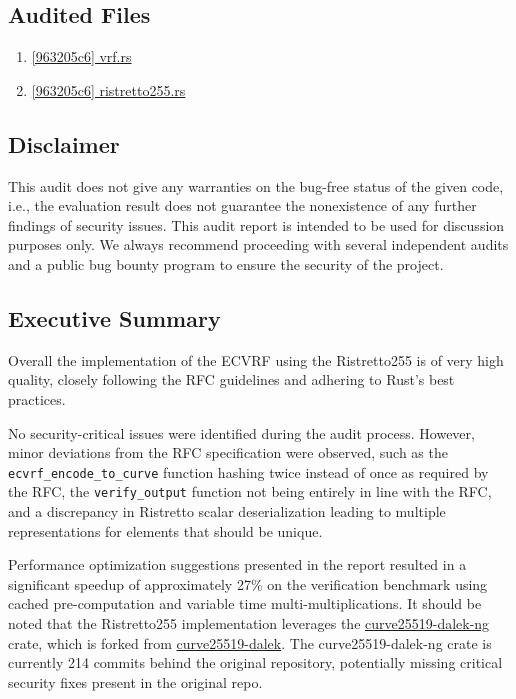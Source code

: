 \subsection{Audited Files} 
\begin{enumerate}
    \item{\href{https://github.com/MystenLabs/fastcrypto/blob/963205c6d0538fe548b8b10037cf87a53af6f424/fastcrypto/src/vrf.rs}{[963205c6] vrf.rs}}
    \item{\href{https://github.com/MystenLabs/fastcrypto/blob/main/fastcrypto/src/groups/ristretto255.rs}{[963205c6] ristretto255.rs}}
\end{enumerate}

\subsection{Disclaimer}
This audit does not give any warranties on the bug-free status of the given code, i.e., the evaluation result does not guarantee the nonexistence of any further findings of security issues. This audit report is intended to be used for discussion purposes only. We always recommend proceeding with several independent audits and a public bug bounty program to ensure the security of the project.

\subsection{Executive Summary}
Overall the implementation of the ECVRF using the Ristretto255 is of very high quality, closely following the RFC guidelines and adhering to Rust's best practices.

No security-critical issues were identified during the audit process. However, minor deviations from the RFC specification were observed, such as the \lstinline{ecvrf_encode_to_curve} function hashing twice instead of once as required by the RFC, the \lstinline{verify_output} function not being entirely in line with the RFC, and a discrepancy in Ristretto scalar deserialization leading to multiple representations for elements that should be unique.

Performance optimization suggestions presented in the report resulted in a significant speedup of approximately 27\% on the verification benchmark using cached pre-computation and variable time multi-multiplications. It should be noted that the Ristretto255 implementation leverages the \href{https://github.com/zkcrypto/curve25519-dalek-ng}{curve25519-dalek-ng} crate, which is forked from \href{https://github.com/dalek-cryptography/curve25519-dalek}{curve25519-dalek}. The curve25519-dalek-ng crate is currently 214 commits behind the original repository, potentially missing critical security fixes present in the original repo.

